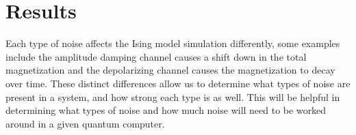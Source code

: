 \documentclass[12pt, twocolumn]{article}
\begin{document}
  \section{Results}

  Each type of noise affects the Ising model simulation differently, some examples include the amplitude damping channel causes a shift down in the total magnetization and the depolarizing channel causes the magnetization to decay over time. These distinct differences allow us to determine what types of noise are present in a system, and how strong each type is as well. This will be helpful in determining what types of noise and how much noise will need to be worked around in a given quantum computer.

  \printbibliography
\end{document}
